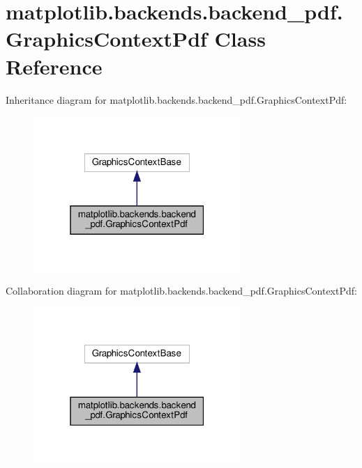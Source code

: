\hypertarget{classmatplotlib_1_1backends_1_1backend__pdf_1_1GraphicsContextPdf}{}\section{matplotlib.\+backends.\+backend\+\_\+pdf.\+Graphics\+Context\+Pdf Class Reference}
\label{classmatplotlib_1_1backends_1_1backend__pdf_1_1GraphicsContextPdf}


Inheritance diagram for matplotlib.\+backends.\+backend\+\_\+pdf.\+Graphics\+Context\+Pdf\+:
\nopagebreak
\begin{figure}[H]
\begin{center}
\leavevmode
\includegraphics[width=223pt]{classmatplotlib_1_1backends_1_1backend__pdf_1_1GraphicsContextPdf__inherit__graph}
\end{center}
\end{figure}


Collaboration diagram for matplotlib.\+backends.\+backend\+\_\+pdf.\+Graphics\+Context\+Pdf\+:
\nopagebreak
\begin{figure}[H]
\begin{center}
\leavevmode
\includegraphics[width=223pt]{classmatplotlib_1_1backends_1_1backend__pdf_1_1GraphicsContextPdf__coll__graph}
\end{center}
\end{figure}
